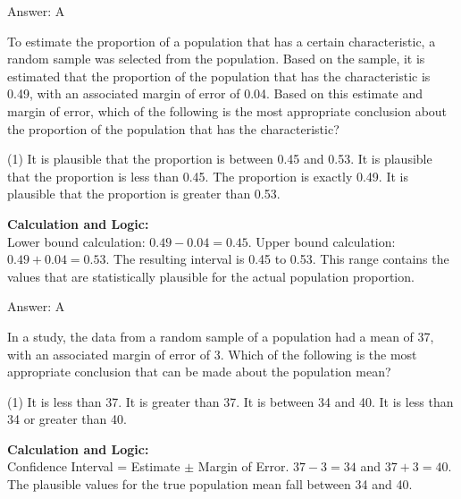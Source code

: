 \documentclass[11pt,paper=a4,answers]{exam}
\begin{document}
\begin{questions}
\begin{solution}
Answer: \colorbox{yellow!100}{A}
\end{solution}

\vspace{60pt}

\question
To estimate the proportion of a population that has a certain characteristic, a random sample was selected from the population. Based on the sample, it is estimated that the proportion of the population that has the characteristic is 0.49, with an associated margin of error of 0.04. Based on this estimate and margin of error, which of the following is the most appropriate conclusion about the proportion of the population that has the characteristic?
\begin{tasks}(1)
    \task It is plausible that the proportion is between 0.45 and 0.53.
    \task It is plausible that the proportion is less than 0.45.
    \task The proportion is exactly 0.49.
    \task It is plausible that the proportion is greater than 0.53.
\end{tasks}

\begin{solution}
\textbf{Calculation and Logic:} \\
Lower bound calculation: $0.49 - 0.04 = 0.45$. Upper bound calculation: $0.49 + 0.04 = 0.53$. The resulting interval is 0.45 to 0.53. This range contains the values that are statistically plausible for the actual population proportion.

\vspace{30pt}

Answer: \colorbox{yellow!100}{A}
\end{solution}

\vspace{60pt}

\question
In a study, the data from a random sample of a population had a mean of 37, with an associated margin of error of 3. Which of the following is the most appropriate conclusion that can be made about the population mean?
\begin{tasks}(1)
    \task It is less than 37.
    \task It is greater than 37.
    \task It is between 34 and 40.
    \task It is less than 34 or greater than 40.
\end{tasks}

\begin{solution}
\textbf{Calculation and Logic:} \\
Confidence Interval = Estimate $\pm$ Margin of Error. $37 - 3 = 34$ and $37 + 3 = 40$. The plausible values for the true population mean fall between 34 and 40.


\end{solution}
\end{questions}
\end{document}

